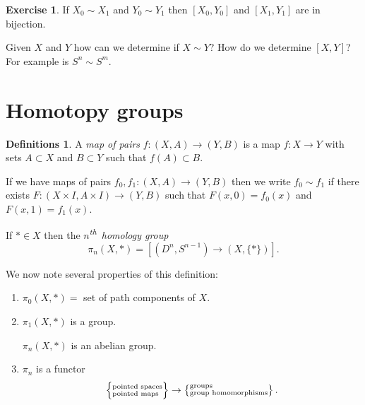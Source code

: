 \documentclass{article}
\theoremstyle{definition}
\newtheorem*{defns}{Definitions}
\newtheorem*{exer}{Exercise}
\renewcommand{\th}{\textsuperscript{th}\ }
\begin{document}
\begin{exer}
  If $X_0 \sim X_1$ and $Y_0 \sim Y_1$ then $[X_0, Y_0]$ and $[X_1,
  Y_1]$ are in bijection.
\end{exer}

Given $X$ and $Y$ how can we determine if $X\sim Y$?
How do we determine $[X,Y]$?
For example is $S^n \sim S^m$.

\section{Homotopy groups}

\begin{defns}
  A \emph{map of pairs} $f\colon (X, A) \to (Y, B)$ is a map $f\colon X
  \to Y$ with sets $A\subset X$ and $B\subset Y$ such that $f(A)\subset
  B$.

  If we have maps of pairs $f_0, f_1\colon (X,A) \to (Y,B)$ then we
  write $f_0\sim f_1$ if there exists $F\colon(X\times I, A\times I) \to
  (Y,B)$ such that $F(x,0) = f_0(x)$ and $F(x,1) = f_1(x)$.

  If $*\in X$ then the \emph{$n$\th homology group}
  \[\pi_n(X, *) = [(D^n, S^{n-1}) \to (X, \{*\})].\]
\end{defns}

We now note several properties of this definition:
\begin{enumerate}
  \item $\pi_0(X, *) =$ set of path components of $X$.

  \item $\pi_1(X, *)$ is a group.
  
  $\pi_n(X, *)$ is an abelian group. %

  \item $\pi_n$ is a functor
    \[\left\{ \begin{subarray}{l}\text{pointed spaces} \\ \text{pointed
    maps} \end{subarray}\right\} \to \left\{\begin{subarray}{l}
    \text{groups}\\ \text{group homomorphisms}\end{subarray}\right\}.\]
\end{enumerate}
\end{document}
